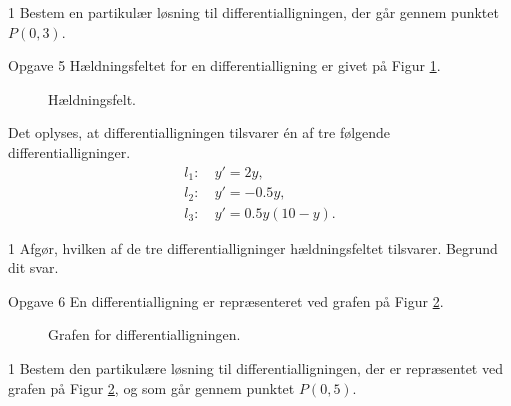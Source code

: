 \begin{delopgave}{1}
	Bestem en partikulær løsning til differentialligningen, der går gennem punktet $P(0, 3)$.
\end{delopgave}
%
%
%
%
%
\begin{opgavetekst}{Opgave 5}
	Hældningsfeltet for en differentialligning er givet på Figur \ref{fig:opgfelt}.
	\begin{figure}[H]
	\centering
	\caption{Hældningsfelt.}
	\label{fig:opgfelt}
	\end{figure}
	Det oplyses, at differentialligningen tilsvarer én af tre følgende differentialligninger.
	\begin{align*}
		l_1:& \ y' = 2y,\\
		l_2:& \ y' = -0.5y,\\
		l_3:& \ y' = 0.5y(10-y).
	\end{align*}
\end{opgavetekst}
\begin{delopgave}{1}
	Afgør, hvilken af de tre differentialligninger hældningsfeltet tilsvarer. Begrund dit svar. 
\end{delopgave}
%
%
%
%
%
\newpage
\begin{opgavetekst}{Opgave 6}
	En differentialligning er repræsenteret ved grafen på Figur \ref{fig:yymaerke}.
	\begin{figure}[H]
		\centering
		\caption{Grafen for differentialligningen.}
		\label{fig:yymaerke}
	\end{figure}
	\phantom{h}
\end{opgavetekst}
\begin{delopgave}{1}
	Bestem den partikulære løsning til differentialligningen, der er repræsentet ved grafen på Figur \ref{fig:yymaerke}, og som går gennem punktet $P(0,5)$.
\end{delopgave}
%
%
%
%
%

